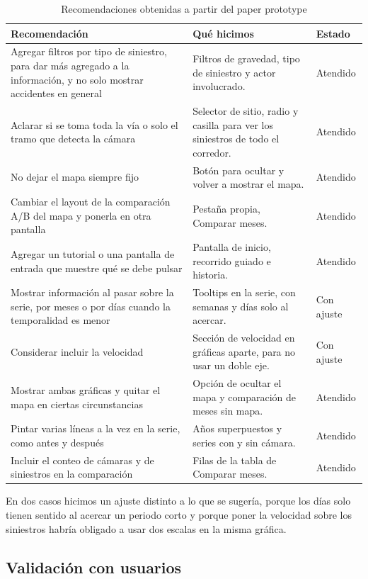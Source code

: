 \documentclass[10pt,a4paper]{article}
\begin{document}
\begin{table}[!htbp]\centering\small
\begin{tabularx}{\linewidth}{P{6.6cm}Ll}
\toprule
\textbf{Recomendación} & \textbf{Qué hicimos} & \textbf{Estado}\\
\midrule
Agregar filtros por tipo de siniestro, para dar más agregado a la información, y no solo mostrar accidentes en general & Filtros de gravedad, tipo de siniestro y actor involucrado. & Atendido\\
Aclarar si se toma toda la vía o solo el tramo que detecta la cámara & Selector de sitio, radio y casilla para ver los siniestros de todo el corredor. & Atendido\\
No dejar el mapa siempre fijo & Botón para ocultar y volver a mostrar el mapa. & Atendido\\
Cambiar el layout de la comparación A/B del mapa y ponerla en otra pantalla & Pestaña propia, Comparar meses. & Atendido\\
Agregar un tutorial o una pantalla de entrada que muestre qué se debe pulsar & Pantalla de inicio, recorrido guiado e historia. & Atendido\\
Mostrar información al pasar sobre la serie, por meses o por días cuando la temporalidad es menor & Tooltips en la serie, con semanas y días solo al acercar. & Con ajuste\\
Considerar incluir la velocidad & Sección de velocidad en gráficas aparte, para no usar un doble eje. & Con ajuste\\
Mostrar ambas gráficas y quitar el mapa en ciertas circunstancias & Opción de ocultar el mapa y comparación de meses sin mapa. & Atendido\\
Pintar varias líneas a la vez en la serie, como antes y después & Años superpuestos y series con y sin cámara. & Atendido\\
Incluir el conteo de cámaras y de siniestros en la comparación & Filas de la tabla de Comparar meses. & Atendido\\
\bottomrule
\end{tabularx}
\caption{Recomendaciones obtenidas a partir del paper prototype}
\end{table}

En dos casos hicimos un ajuste distinto a lo que se sugería, porque los días solo tienen sentido al acercar un periodo corto y porque poner la velocidad sobre los siniestros habría obligado a usar dos escalas en la misma gráfica.

\subsection{Validación con usuarios}
\end{document}
